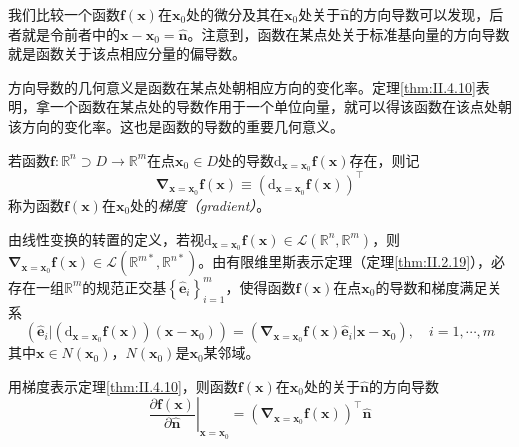 \documentclass[main.tex]{subfiles}
\begin{document}
我们比较一个函数$\mathbf{f}\left(\mathbf{x}\right)$在$\mathbf{x}_0$处的微分及其在$\mathbf{x}_0$处关于$\mathbf{\hat{n}}$的方向导数可以发现，后者就是令前者中的$\mathbf{x}-\mathbf{x}_0=\mathbf{\hat{n}}$。注意到，函数在某点处关于标准基向量的方向导数就是函数关于该点相应分量的偏导数。

方向导数的几何意义是函数在某点处朝相应方向的变化率。定理\ref{thm:II.4.10}表明，拿一个函数在某点处的导数作用于一个单位向量，就可以得该函数在该点处朝该方向的变化率。这也是函数的导数的重要几何意义。

\begin{definition}[向量函数的梯度]\label{def:II.4.19}
    若函数$\mathbf{f}:\mathbb{R}^n\supset D\rightarrow\mathbb{R}^m$在点$\mathbf{x}_0\in D$处的导数$\mathrm{d}_{\mathbf{x}=\mathbf{x}_0}\mathbf{f}\left(\mathbf{x}\right)$存在，则记
    \[\mathbf{\nabla}_{\mathbf{x}=\mathbf{x}_0}\mathbf{f}\left(\mathbf{x}\right)\equiv\left(\mathrm{d}_{\mathbf{x}=\mathbf{x}_0}\mathbf{f}\left(\mathbf{x}\right)\right)^\intercal\]
    称为函数$\mathbf{f}\left(\mathbf{x}\right)$在$\mathbf{x}_0$处的\emph{梯度（gradient）}。
\end{definition}

由线性变换的转置的定义，若视$\mathrm{d}_{\mathbf{x}=\mathbf{x}_0}\mathbf{f}\left(\mathbf{x}\right)\in\mathcal{L}\left(\mathbb{R}^n,\mathbb{R}^m\right)$，则$\mathbf{\nabla}_{\mathbf{x}=\mathbf{x}_0}\mathbf{f}\left(\mathbf{x}\right)\in\mathcal{L}\left(\mathbb{R}^{m*},\mathbb{R}^{n*}\right)$。由有限维里斯表示定理（定理\ref{thm:II.2.19}），必存在一组$\mathbb{R}^m$的规范正交基$\left\{\mathbf{\hat{e}}_i\right\}_{i=1}^m$，使得函数$\mathbf{f}\left(\mathbf{x}\right)$在点$\mathbf{x}_0$的导数和梯度满足关系
\[\left(\mathbf{\hat{e}}_i|\left(\mathrm{d}_{\mathbf{x}=\mathbf{x}_0}\mathbf{f}\left(\mathbf{x}\right)\right)\left(\mathbf{x}-\mathbf{x}_0\right)\right)=\left(\mathbf{\nabla}_{\mathbf{x}=\mathbf{x}_0}\mathbf{f}\left(\mathbf{x}\right)\mathbf{\hat{e}}_i|\mathbf{x}-\mathbf{x}_0\right),\quad i=1,\cdots,m\]
其中$\mathbf{x}\in N\left(\mathbf{x}_0\right)$，$N\left(\mathbf{x}_0\right)$是$\mathbf{x}_0$某邻域。

用梯度表示定理\ref{thm:II.4.10}，则函数$\mathbf{f}\left(\mathbf{x}\right)$在$\mathbf{x}_0$处的关于$\mathbf{\hat{n}}$的方向导数
\[\left.\frac{\partial\mathbf{f}\left(\mathbf{x}\right)}{\partial \mathbf{\hat{n}}}\right|_{\mathbf{x}=\mathbf{x}_0}=\left(\mathbf{\nabla}_{\mathbf{x}=\mathbf{x}_0}\mathbf{f}\left(\mathbf{x}\right)\right)^\intercal\mathbf{\hat{n}}\]
\end{document}
